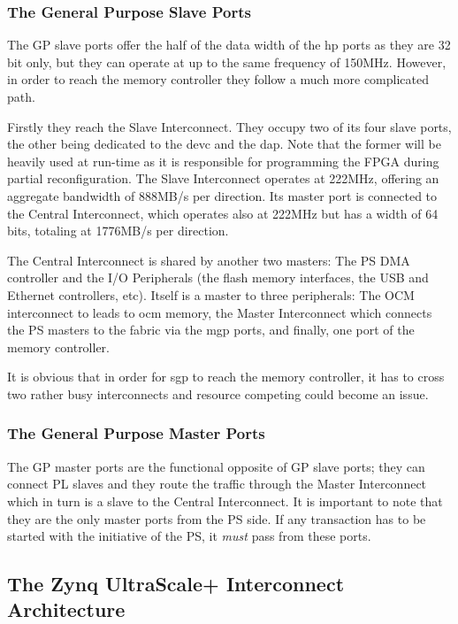 \subsubsection{The General Purpose Slave Ports}
\label{sect:sgp}

The GP slave ports offer the half of the data width
of the \gls{hp} ports as they are 32 bit only,
but they can operate at up to the same frequency of 150MHz.
However, in order to reach the memory controller
they follow a much more complicated path.

Firstly they reach the Slave Interconnect.
They occupy two of its four slave ports,
the other being dedicated to the
\gls{devc} and the \gls{dap}.
Note that the former will be heavily used at run-time as it is responsible
for programming the FPGA during partial reconfiguration.
The Slave Interconnect operates at 222MHz,
offering an aggregate bandwidth of 888MB/s per direction.
Its master port is connected to the Central Interconnect,
which operates also at 222MHz but has a width of 64 bits,
totaling at 1776MB/s per direction.

The Central Interconnect is shared by another two masters:
The PS DMA controller and the I/O Peripherals
(the flash memory interfaces, the USB and Ethernet controllers, etc).
Itself is a master to three peripherals:
The OCM interconnect to leads to \gls{ocm} memory, the Master Interconnect
which connects the PS masters to the \gls{fabric} via the \gls{mgp} ports,
and finally, one port of the memory controller.

It is obvious that in order for \gls{sgp} to reach the memory controller,
it has to cross two rather busy interconnects and resource competing
could become an issue.

\subsubsection{The General Purpose Master Ports}

The GP master ports are the functional opposite of GP slave ports;
they can connect PL slaves and they route the traffic through the
Master Interconnect which in turn is a slave to the Central Interconnect.
It is important to note that they are the only master ports from the PS side.
If any transaction has to be started with the initiative of the PS,
it \emph{must} pass from these ports.

\subsection{The Zynq UltraScale+ Interconnect Architecture}

